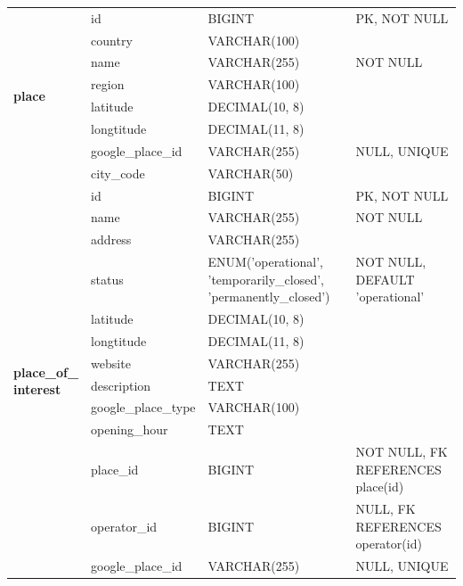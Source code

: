 {\begin{longtable}{|p{2.5cm}|p{3.2cm}|p{4.5cm}|p{4.3cm}|}
\multirow{8}{2.5cm}{\textbf{place}} 
    & id & BIGINT & PK, NOT NULL \\ \cline{2-4} 
    & country & VARCHAR(100) & \\ \cline{2-4} 
    & name & VARCHAR(255) & NOT NULL \\ \cline{2-4} 
    & region & VARCHAR(100) & \\ \cline{2-4} 
    & latitude & DECIMAL(10, 8) & \\ \cline{2-4} 
    & longtitude & DECIMAL(11, 8) & \\ \cline{2-4} 
    & google\_place\_id & VARCHAR(255) & NULL, UNIQUE \\ \cline{2-4} 
    & city\_code & VARCHAR(50) & \\ \hline

\multirow{13}{2.5cm}{\textbf{place\_of\_\newline interest}} 
    & id & BIGINT & PK, NOT NULL \\ \cline{2-4} 
    & name & VARCHAR(255) & NOT NULL \\ \cline{2-4} 
    & address & VARCHAR(255) & \\ \cline{2-4} 
    & status & ENUM('operational', 'temporarily\_closed', 'permanently\_closed') & NOT NULL, DEFAULT 'operational' \\ \cline{2-4} 
    & latitude & DECIMAL(10, 8) & \\ \cline{2-4} 
    & longtitude & DECIMAL(11, 8) & \\ \cline{2-4} 
    & website & VARCHAR(255) & \\ \cline{2-4} 
    & description & TEXT & \\ \cline{2-4} 
    & google\_place\_type & VARCHAR(100) & \\ \cline{2-4} 
    & opening\_hour & TEXT & \\ \cline{2-4} 
    & place\_id & BIGINT & NOT NULL, FK REFERENCES place(id) \\ \cline{2-4} 
    & operator\_id & BIGINT & NULL, FK REFERENCES operator(id) \\ \cline{2-4} 
    & google\_place\_id & VARCHAR(255) & NULL, UNIQUE \\ \hline


\end{longtable}}
